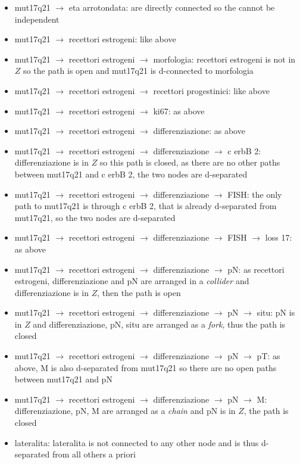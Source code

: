 \begin{itemize}
  \item mut17q21 $\rightarrow$ eta arrotondata: are directly connected so the cannot be independent
  \item mut17q21 $\rightarrow$ recettori estrogeni: like above
  \item mut17q21 $\rightarrow$ recettori estrogeni $\rightarrow$ morfologia: recettori estrogeni is not in $Z$ so the path is open and mut17q21 is d-connected to morfologia
  \item mut17q21 $\rightarrow$ recettori estrogeni $\rightarrow$ recettori progestinici: like above
  \item mut17q21 $\rightarrow$ recettori estrogeni $\rightarrow$ ki67: as above
  \item mut17q21 $\rightarrow$ recettori estrogeni $\rightarrow$ differenziazione: as above
  \item mut17q21 $\rightarrow$ recettori estrogeni $\rightarrow$ differenziazione $\rightarrow$ c erbB 2: differenziazione is in $Z$ so this path is closed, as there are no other paths between mut17q21 and c erbB 2, the two nodes are d-separated
  \item mut17q21 $\rightarrow$ recettori estrogeni $\rightarrow$ differenziazione $\rightarrow$ FISH: the only path to mut17q21 is through c erbB 2, that is already d-separated from mut17q21, so the two nodes are d-separated
  \item mut17q21 $\rightarrow$ recettori estrogeni $\rightarrow$ differenziazione $\rightarrow$ FISH $\rightarrow$ loss 17: as above
  \item mut17q21 $\rightarrow$ recettori estrogeni $\rightarrow$ differenziazione $\rightarrow$ pN: as recettori estrogeni, differenziazione and pN are arranged in a \textit{collider} and differenziazione is in $Z$, then the path is open
  \item mut17q21 $\rightarrow$ recettori estrogeni $\rightarrow$ differenziazione $\rightarrow$ pN $\rightarrow$ situ: pN is in $Z$ and differenziazione, pN, situ are arranged as a \textit{fork}, thus the path is closed
  \item mut17q21 $\rightarrow$ recettori estrogeni $\rightarrow$ differenziazione $\rightarrow$ pN $\rightarrow$ pT: as above, M is also d-separated from mut17q21 so there are no open paths between mut17q21 and pN
  \item mut17q21 $\rightarrow$ recettori estrogeni $\rightarrow$ differenziazione $\rightarrow$ pN $\rightarrow$ M: differenziazione, pN, M are arranged as a \textit{chain} and pN is in $Z$, the path is closed
  \item lateralita: lateralita is not connected to any other node and is thus d-separated from all others a priori
\end{itemize}

